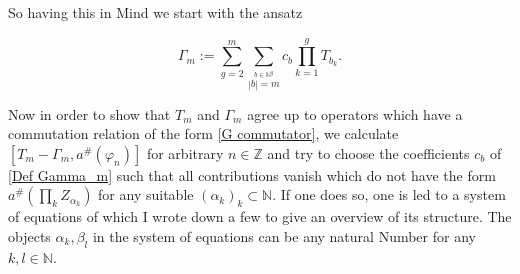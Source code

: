 \documentclass[b5paper,draft,openbib,12pt]{memoir}
\begin{document}
So having this in Mind we start with the ansatz

\begin{equation}\label{Def Gamma_m}
\Gamma_m := \sum_{g=2}^m \sum_{\stackrel{b\in\mathbb{N}^g}{|b|=m}} c_{b} \prod_{k=1}^g T_{b_k}.
\end{equation}

Now in order to show that \(T_m\) and \(\Gamma_m\) agree up to operators which have a commutation 
relation of the form \eqref{G commutator}, we calculate \(\left[ T_m-\Gamma_m, a^\#(\varphi_n) \right]\)
for arbitrary \(n\in\mathbb{Z}\) and try to choose the coefficients \(c_b\) of \eqref{Def Gamma_m}
such that all contributions vanish which do not have the form \(a^\# \left( \prod_k Z_{\alpha_k}\right)\)
for any suitable \((\alpha_k)_k\subset \mathbb{N} \). If one does so, one is led to a system of equations
of which I wrote down a few to give an overview of its structure. The objects \(\alpha_k, \beta_l\) 
in the system of equations can be any natural Number for any \(k,l\in\mathbb{N}\).
\end{document}
